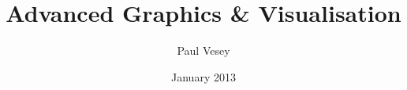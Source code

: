 \documentclass[a4paper,12pt]{book}
\begin{document}
\author{Paul Vesey}
\title{Advanced Graphics \& Visualisation}
\date{January 2013}

\frontmatter
\maketitle
\tableofcontents

\mainmatter



\backmatter
\end{document}
